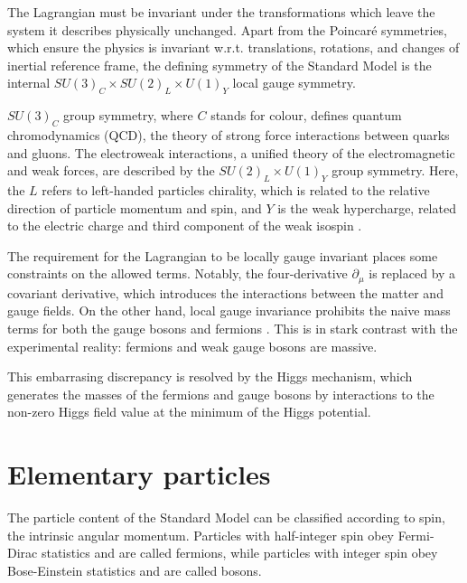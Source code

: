 The Lagrangian must be invariant under the transformations which leave the
system it describes physically unchanged. Apart from the Poincar\'e symmetries, which
ensure the physics is invariant w.r.t. translations, rotations, and changes of inertial
reference frame, the defining symmetry of the Standard Model is the internal
$SU(3)_C \times SU(2)_L \times U(1)_Y$ local gauge symmetry.

$SU(3)_C$ group symmetry, where $C$ stands for colour, defines quantum chromodynamics
(QCD), the theory of strong force interactions between quarks and gluons. The electroweak
interactions, a unified theory of the electromagnetic and weak forces, are described by
the $SU(2)_L \times U(1)_Y$ group symmetry. Here, the $L$ refers to left-handed particles
chirality, which is related to the relative direction of particle momentum and spin, and
$Y$ is the weak hypercharge, related to the electric charge and third component of the
weak isospin \cite{Thomson:2013zua}.

The requirement for the Lagrangian to be locally gauge invariant places some constraints
on the allowed terms. Notably, the four-derivative $\partial_\mu$ is replaced by a 
covariant derivative, which introduces the interactions between the matter and gauge
fields. On the other hand, local gauge invariance prohibits the naive mass terms for
both the gauge bosons and fermions \cite{Thomson:2013zua}. This is in stark contrast
with the experimental reality: fermions and weak gauge bosons are massive.

This embarrasing discrepancy is resolved by the Higgs mechanism, which generates the
masses of the fermions and gauge bosons by interactions to the non-zero Higgs field
value at the minimum of the Higgs potential.

\section{Elementary particles}

The particle content of the Standard Model can be classified according to spin, the
intrinsic angular momentum. Particles with half-integer spin obey Fermi-Dirac statistics
and are called fermions, while particles with integer spin obey Bose-Einstein
statistics and are called bosons.

